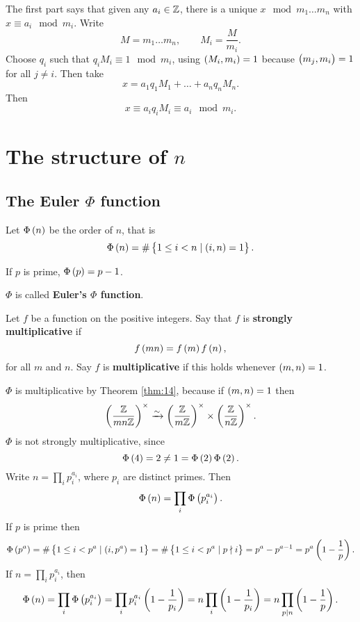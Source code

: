 The first part says that given any $ a_i \in \mathbb{Z} $, there is a unique $ x \mod m_1 \dots m_n $ with $ x \equiv a_i \mod m_i $. Write
$$ M = m_1 \dots m_n, \qquad M_i = \dfrac{M}{m_i}. $$
Choose $ q_i $ such that $ q_iM_i \equiv 1 \mod m_i $, using $ \br{M_i, m_i} = 1 $ because $ \br{m_j, m_i} = 1 $ for all $ j \ne i $. Then take
$$ x = a_1q_1M_1 + \dots + a_nq_nM_n. $$
Then
$$ x \equiv a_iq_iM_i \equiv a_i \mod m_i. $$

\pagebreak

\section{The structure of \texorpdfstring{$ \unit{n} $}{Z/nZ}}

\subsection{The Euler \texorpdfstring{$ \Phi $}{Phi} function}

Let $ \Phi\br{n} $ be the order of $ \unit{n} $, that is
$$ \Phi\br{n} = \#\cbr{1 \le i < n \mid \br{i, n} = 1}. $$

\begin{example*}
If $ p $ is prime, $ \Phi\br{p} = p - 1 $.
\end{example*}

$ \Phi $ is called \textbf{Euler's $ \Phi $ function}.

\begin{definition}
Let $ f $ be a function on the positive integers. Say that $ f $ is \textbf{strongly multiplicative} if
$$ f\br{mn} = f\br{m}f\br{n}, $$
for all $ m $ and $ n $. Say $ f $ is \textbf{multiplicative} if this holds whenever $ \br{m, n} = 1 $.
\end{definition}

$ \Phi $ is multiplicative by Theorem \ref{thm:14}, because if $ \br{m, n} = 1 $ then
$$ \Unit{mn} \xrightarrow{\sim} \Unit{m} \times \Unit{n}. $$
$ \Phi $ is not strongly multiplicative, since
$$ \Phi\br{4} = 2 \ne 1 = \Phi\br{2}\Phi\br{2}. $$
Write $ n = \prod_i p_i^{a_i} $, where $ p_i $ are distinct primes. Then
$$ \Phi\br{n} = \prod_i \Phi\br{p_i^{a_i}}. $$
If $ p $ is prime then
$$ \Phi\br{p^a} = \#\cbr{1 \le i < p^a \mid \br{i, p^a} = 1} = \#\cbr{1 \le i < p^a \mid p \nmid i} = p^a - p^{a - 1} = p^a\br{1 - \dfrac{1}{p}}. $$
If $ n = \prod_i p_i^{a_i} $, then
$$ \Phi\br{n} = \prod_i \Phi\br{p_i^{a_i}} = \prod_i p_i^{a_i}\br{1 - \dfrac{1}{p_i}} = n\prod_i \br{1 - \dfrac{1}{p_i}} = n\prod_{p \mid n} \br{1 - \dfrac{1}{p}}. $$

